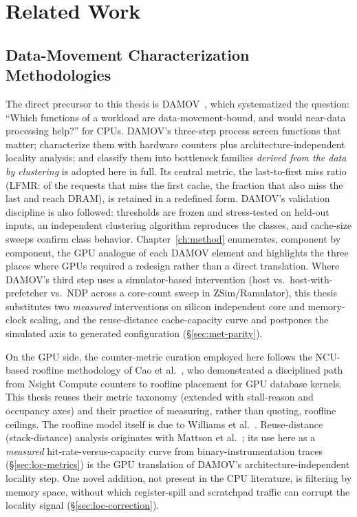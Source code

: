 \chapter{Related Work}
\label{ch:related}

\section{Data-Movement Characterization Methodologies}

The direct precursor to this thesis is DAMOV~\cite{oliveira2021damov}, which systematized the question: ``Which functions of a workload are data-movement-bound, and would near-data processing help?'' for CPUs. DAMOV's three-step process screen functions that matter; characterize them with hardware counters plus architecture-independent locality analysis; and classify them into bottleneck families \emph{derived from the data by clustering} is adopted here in full. Its central metric, the last-to-first miss ratio (LFMR: of the requests that miss the first cache, the fraction that also miss the last and reach DRAM), is retained in a redefined form. DAMOV's validation discipline is also followed: thresholds are frozen and stress-tested on held-out inputs, an independent clustering algorithm reproduces the classes, and cache-size sweeps confirm class behavior. Chapter~\ref{ch:method} enumerates, component by component, the GPU analogue of each DAMOV element and highlights the three places where GPUs required a redesign rather than a direct translation. Where DAMOV's third step uses a simulator-based intervention (host vs.\ host-with-prefetcher vs.\ NDP across a core-count sweep in ZSim/Ramulator), this thesis substitutes two \emph{measured} interventions on silicon independent core and memory-clock scaling, and the reuse-distance cache-capacity curve and postpones the simulated axis to generated configuration (\S\ref{sec:met-parity}).

On the GPU side, the counter-metric curation employed here follows the NCU-based roofline methodology of Cao et al.~\cite{cao2023gpudb}, who demonstrated a disciplined path from Nsight Compute counters to roofline placement for GPU database kernels. This thesis reuses their metric taxonomy (extended with stall-reason and occupancy axes) and their practice of measuring, rather than quoting, roofline ceilings. The roofline model itself is due to Williams et al.~\cite{williams2009roofline}. Reuse-distance (stack-distance) analysis originates with Mattson et al.~\cite{mattson1970stack}; its use here as a \emph{measured} hit-rate-versus-capacity curve from binary-instrumentation traces (\S\ref{sec:loc-metrics}) is the GPU translation of DAMOV's architecture-independent locality step. One novel addition, not present in the CPU literature, is filtering by memory space, without which register-spill and scratchpad traffic can corrupt the locality signal (\S\ref{sec:loc-correction}).

